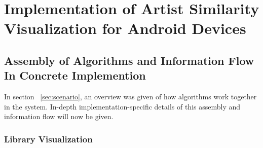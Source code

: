 \section{Implementation of Artist Similarity Visualization for Android Devices}
\label{sec:implementation}

\subsection{Assembly of Algorithms and Information Flow In Concrete Implemention}

In section ~\ref{sec:scenario}, an overview was given of how algorithms work together in the system. In-depth implementation-specific details of this assembly and information flow will now be given.

\subsubsection{Library Visualization}


